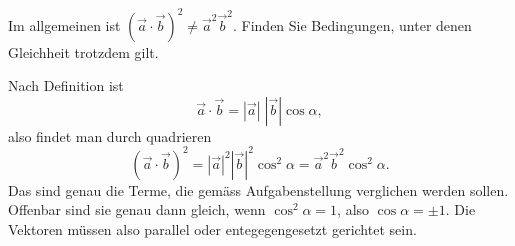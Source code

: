 Im allgemeinen ist $(\vec a\cdot \vec b )^2\ne \vec a^2\vec b^2$.
Finden Sie Bedingungen, unter denen Gleichheit trotzdem gilt.

\begin{loesung}
Nach Definition ist
\[
\vec a\cdot\vec b=|\vec a|\;|\vec b|\cos\alpha ,
\]
also findet man durch quadrieren
\[
(\vec a\cdot\vec b)^2
=
|\vec a|^2|\vec b|^2 \cos^2 \alpha
=
\vec a^2\vec b^2 \cos^2 \alpha.
\]
Das sind genau die Terme, die gemäss Aufgabenstellung verglichen werden
sollen. Offenbar sind sie genau dann gleich, wenn $\cos^2\alpha=1$,
also
$\cos\alpha=\pm 1$. Die Vektoren müssen also parallel oder
entegegengesetzt gerichtet sein.
\end{loesung}

